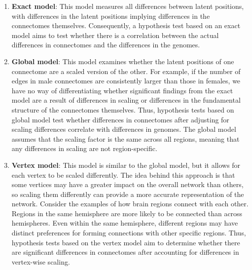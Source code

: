 \begin{enumerate}[leftmargin=*]
    \item \textbf{Exact model}: This model measures all differences between latent positions, with differences in the latent positions implying differences in the connectomes themselves. Consequently, a hypothesis test based on an exact model aims to test whether there is a correlation between the actual differences in connectomes and the differences in the genomes. 
    \item \textbf{Global model}: This model examines whether the latent positions of one connectome are a scaled version of the other. For example, if the number of edges in male connectomes are consistently larger than those in females, we have no way of differentiating whether significant findings from the exact model are a result of differences in scaling or differences in the fundamental structure of the connectomes themselves. Thus, hypothesis tests based on global model test whether differences in connectomes after adjusting for scaling differences correlate with differences in genomes. The global model assumes that the scaling factor is the same across all regions, meaning that any differences in scaling are not region-specific.
    \item \textbf{Vertex model}: This model is similar to the global model, but it allows for each vertex to be scaled differently. The idea behind this approach is that some vertices may have a greater impact on the overall network than others, so scaling them differently can provide a more accurate representation of the network. Consider the examples of how brain regions connect with each other. Regions in the same hemisphere are more likely to be connected than across hemispheres. Even within the same hemisphere, different regions may have distinct preferences for forming connections with other specific regions. Thus, hypothesis tests based on the vertex model aim to determine whether there are significant differences in connectomes after accounting for differences in vertex-wise scaling. 
\end{enumerate}

